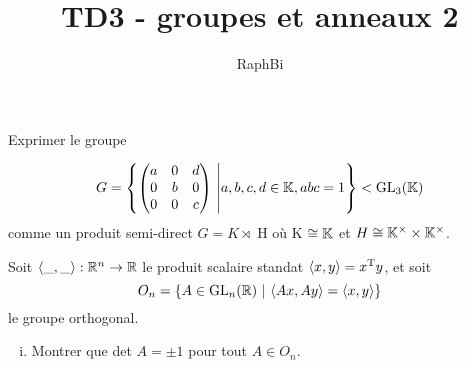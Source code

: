 \documentclass[french,a4paper,10pt]{article}
\title{\color{astral} \sffamily \bfseries TD3 - groupes et anneaux 2}
\author{RaphBi}
\begin{document}
    \maketitle
    \begin{td-exo}[1]
        Exprimer le groupe

        $$G = \left\{\begin{pmatrix}
            a & 0 & d\\
            0 & b & 0\\
            0 & 0 & c \end{pmatrix}\ 
            \middle| a,b,c,d \in \bb K, abc=1\right\} < \textmd{GL}_3(\bb K)$$
        comme un produit semi-direct $G = K \rtimes$ H où K $\cong \mathbb{K}$ et $H \cong \mathbb{K}^\times \times \mathbb{K}^\times$.
    \end{td-exo}

    \begin{td-exo}[2]
        Soit $\langle \_,\_\rangle: \mathbb{R}^n \rightarrow \mathbb{R}$ le produit scalaire standat $\langle x,y\rangle = x^\textmd{T}y$, et soit
        $$O_n = \left\{ A\in \textmd{GL}_n(\mathbb{R})\ | \ \langle Ax,Ay\rangle = \langle x,y \rangle \right\}$$ le groupe orthogonal.
        \begin{enumerate}[(i)]
            \item Montrer que det $A = \pm 1$ pour tout $A\in O_n$.
        \end{enumerate}
    \end{td-exo}
\end{document}
